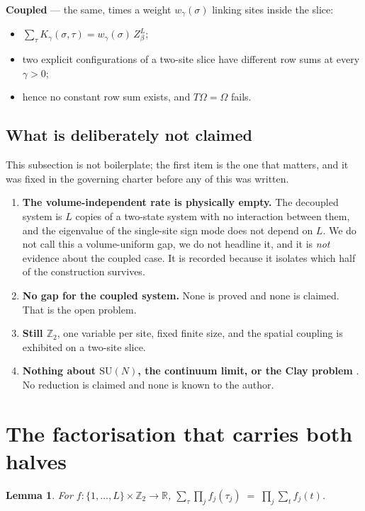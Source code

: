 \documentclass[11pt]{article}
\newtheorem{lemma}[theorem]{Lemma}
\theoremstyle{definition}
\newcommand{\R}{\mathbb{R}}
\newcommand{\Z}{\mathbb{Z}}
\newcommand{\SU}{\mathrm{SU}}
\newcommand{\Om}{\Omega}
\begin{document}
\medskip
\noindent\textbf{Coupled} --- the same, times a weight $w_\gamma(\sigma)$
linking sites inside the slice:
\begin{itemize}
\item $\sum_\tau K_\gamma(\sigma,\tau) = w_\gamma(\sigma)\,Z_\beta^{L}$;
\item two explicit configurations of a two-site slice have different row sums
      at every $\gamma>0$;
\item hence no constant row sum exists, and $T\Om=\Om$ fails.
\end{itemize}

\subsection{What is deliberately not claimed}

This subsection is not boilerplate; the first item is the one that matters, and
it was fixed in the governing charter before any of this was written.

\begin{enumerate}
\item \textbf{The volume-independent rate is physically empty.}  The decoupled
system is $L$ copies of a two-state system with no interaction between them, and
the eigenvalue of the single-site sign mode does not depend on $L$.  We do not
call this a volume-uniform gap, we do not headline it, and it is
\emph{not} evidence about the coupled case.  It is recorded because it isolates
which half of the construction survives.
\item \textbf{No gap for the coupled system.}  None is proved and none is
claimed.  That is the open problem.
\item \textbf{Still $\Z_2$}, one variable per site, fixed finite size, and the
spatial coupling is exhibited on a two-site slice.
\item \textbf{Nothing about $\SU(N)$, the continuum limit, or the Clay problem}
\cite{Clay}.  No reduction is claimed and none is known to the author.
\end{enumerate}

\section{The factorisation that carries both halves}

\begin{lemma}\label{lem:factor}
For $f:\{1,\dots,L\}\times\Z_2\to\R$,
$\displaystyle\sum_{\tau}\prod_j f_j(\tau_j) \;=\; \prod_j \sum_{t} f_j(t)$.
\end{lemma}
\end{document}
